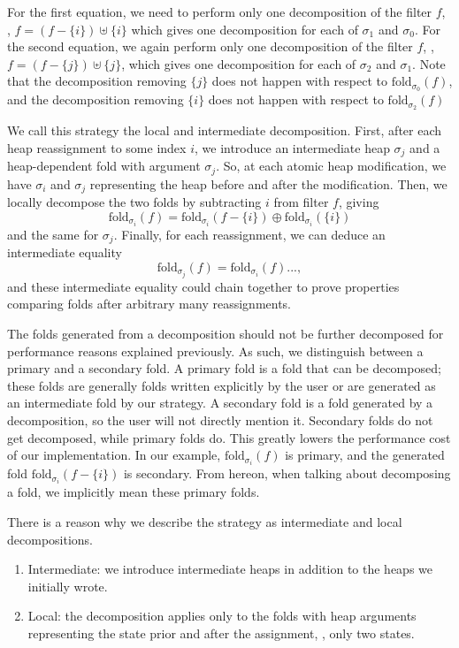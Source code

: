 \documentclass[msc,oneside]{ubcthesis}
\begin{document}
For the first equation, we need to perform only one decomposition of the filter $f$, \ie, $f = (f - \{i\}) \uplus \{i\}$ which gives one decomposition for each of $\sigma_1$ and $\sigma_0$. For the second equation, we again perform only one decomposition of the filter $f$, \ie, $f = (f - \{j\}) \uplus \{j\}$, which gives one decomposition for each of $\sigma_2$ and $\sigma_1$. Note that the decomposition removing $\{j\}$ does not happen with respect to $\textrm{fold}_{\sigma_0}(f)$, and the decomposition removing $\{i\}$ does not happen with respect to $\textrm{fold}_{\sigma_2}(f)$

We call this strategy the local and intermediate decomposition. First, after each heap reassignment to some index $i$, we introduce an intermediate heap $\sigma_j$ and a heap-dependent fold with argument $\sigma_j$. So, at each atomic heap modification, we have $\sigma_i$ and $\sigma_j$ representing the heap before and after the modification. Then, we locally decompose the two folds by subtracting $i$ from filter $f$, giving $$\textrm{fold}_{\sigma_i}(f) = \textrm{fold}_{\sigma_i}(f - \{i\}) \oplus \textrm{fold}_{\sigma_i}(\{i\})$$ and the same for $\sigma_j$.
Finally, for each reassignment, we can deduce an intermediate equality 
$$ \textrm{fold}_{\sigma_j}(f) = \textrm{fold}_{\sigma_i}(f) ...,$$ and these intermediate equality could chain together to prove properties comparing folds after arbitrary many reassignments. 

The folds generated from a decomposition should not be further decomposed for performance reasons explained previously. As such, we distinguish between a primary and a secondary fold. A primary fold is a fold that can be decomposed; these folds are generally folds written explicitly by the user or are generated as an intermediate fold by our strategy. A secondary fold is a fold generated by a decomposition, so the user will not directly mention it. Secondary folds do not get decomposed, while primary folds do. This greatly lowers the performance cost of our implementation. In our example, $\textrm{fold}_{\sigma_i}(f)$ is primary, and the generated fold $\textrm{fold}_{\sigma_i}(f - \{i\})$ is secondary. From hereon, when talking about decomposing a fold, we implicitly mean these primary folds.

There is a reason why we describe the strategy as intermediate and local decompositions.
\begin{enumerate}
    \item Intermediate: we introduce intermediate heaps in addition to the heaps we initially wrote.
    \item Local: the decomposition applies only to the folds with heap arguments representing the state prior and after the assignment, \ie, only two states. 
\end{enumerate}
\end{document}
